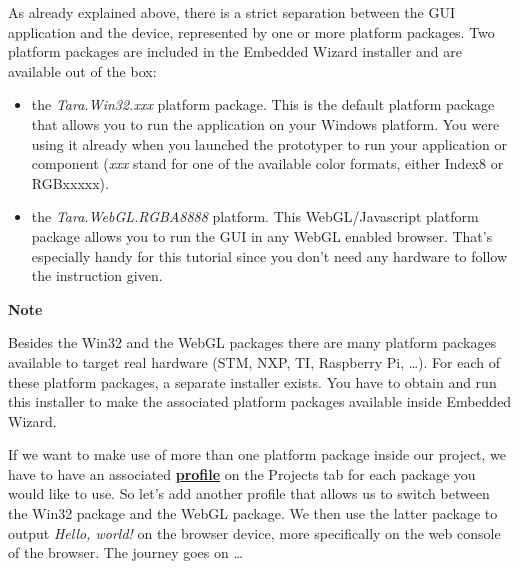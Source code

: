 \documentclass[
  a4paper,
,tablecaptionabove
]{scrbook}
\renewenvironment{quote}{\begin{customblockquote}\list{}{\rightmargin=0em\leftmargin=0em}%
\item\relax\color{blockquote-text}\ignorespaces}{\unskip\unskip\endlist\end{customblockquote}}
\begin{document}
As already explained above, there is a strict separation between the GUI
application and the device, represented by one or more platform
packages. Two platform packages are included in the Embedded Wizard
installer and are available out of the box:

\begin{itemize}
\item
  the \emph{Tara.Win32.xxx} platform package. This is the default
  platform package that allows you to run the application on your
  Windows platform. You were using it already when you launched the
  prototyper to run your application or component (\emph{xxx} stand for
  one of the available color formats, either Index8 or RGBxxxxx).
\item
  the \emph{Tara.WebGL.RGBA8888} platform. This WebGL/Javascript
  platform package allows you to run the GUI in any WebGL enabled
  browser. That's especially handy for this tutorial since you don't
  need any hardware to follow the instruction given.
\end{itemize}

\begin{quote}
\textbf{Note}

Besides the Win32 and the WebGL packages there are many platform
packages available to target real hardware (STM, NXP, TI, Raspberry Pi,
\ldots​). For each of these platform packages, a separate installer
exists. You have to obtain and run this installer to make the associated
platform packages available inside Embedded Wizard.
\end{quote}

If we want to make use of more than one platform package inside our
project, we have to have an associated
\textbf{\href{https://doc.embedded-wizard.de/profile-member}{profile}}
on the Projects tab for each package you would like to use. So let's add
another profile that allows us to switch between the Win32 package and
the WebGL package. We then use the latter package to output \emph{Hello,
world!} on the browser device, more specifically on the web console of
the browser. The journey goes on \ldots​
\end{document}

